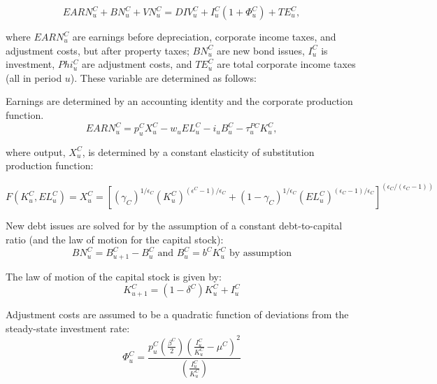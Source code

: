 \documentclass[article,11pt,letterpaper,fleqn]{article}
\theoremstyle{definition}
\numberwithin{equation}{section}
\begin{document}
\begin{equation}
\label{eqn:vn}
EARN^{C}_{u}+BN^{C}_{u}+VN^{C}_{u}=DIV^{C}_{u}+I^{C}_{u}(1+\Phi^{C}_{u})+TE^{C}_{u}, 
\end{equation}

where $EARN^{C}_{u}$ are earnings before depreciation, corporate income taxes, and adjustment costs, but after property taxes; $BN^{C}_{u}$ are new bond issues, $I^{C}_{u}$ is investment, $Phi^{C}_{u}$ are adjustment costs, and $TE^{C}_{u}$ are total corporate income taxes (all in period $u$).  These variable are determined as follows:

Earnings are determined by an accounting identity and the corporate production function.  
\begin{equation}
\label{eqn:earn}
EARN^{C}_{u}=p^{C}_{u}X^{C}_{u}-w_{u}EL^{C}_{u}-i_{u}B^{C}_{u}-\tau^{PC}_{u}K^{C}_{u},
\end{equation}

\noindent\noindent where output, $X^{C}_{u}$, is determined by a constant elasticity of substitution production function:

\begin{equation}
\label{eqn:prod_fun}
F(K^{C}_{u},EL^{C}_{u})=X^{C}_{u} = \left[(\gamma_{C})^{1/\epsilon_{C}}(K^{C}_{u})^{(\epsilon^{C}-1)/\epsilon_{C}}+(1-\gamma_{C})^{1/\epsilon_{C}}(EL^{C}_{u})^{(\epsilon_{C}-1)/\epsilon_{C}}\right]^{(\epsilon_{C}/(\epsilon_{C}-1))}
\end{equation}

New debt issues are solved for by the assumption of a constant debt-to-capital ratio (and the law of motion for the capital stock):
\begin{equation}
\label{eqn:debt}
BN^{C}_{u}=B^{C}_{u+1} - B^{C}_{u} \text{ and } B^{C}_{u}=b^{C}K^{C}_{u} \text{ by assumption} 
\end{equation}

The law of motion of the capital stock is given by:
\begin{equation}
\label{eqn:lom_capital}
K^{C}_{u+1}=(1-\delta^{C})K^{C}_{u} + I^{C}_{u}
\end{equation}

Adjustment costs are assumed to be a quadratic function of deviations from the steady-state investment rate:
\begin{equation}
\label{eqn:adj_cost}
\Phi^{C}_{u}=\frac{p^{C}_{u}\left(\frac{\beta^{C}}{2}\right)\left(\frac{I^{C}_{u}}{K^{C}_{u}}-\mu^{C}\right)^{2}}{\left(\frac{I^{C}_{u}}{K^{C}_{u}}\right)}
\end{equation}
\end{document}
